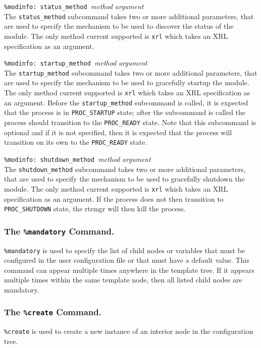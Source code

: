 \documentclass[11pt]{article}
\begin{document}
\begin{description}
\item {{\tt \%modinfo: status\_method }{\it method }{\it argument}}  \\
The {\tt status\_method} subcommand takes two or more additional parameters,
that are used to specify the mechanism to be used to discover the status of
the module.
The only method current supported is {\tt xrl} which takes an XRL
specification as an argument.

\item {{\tt \%modinfo: startup\_method }{\it method }{\it argument}}  \\
The {\tt startup\_method} subcommand takes two or more additional parameters,
that are used to specify the mechanism to be used to gracefully startup the
module. The only method current supported is {\tt xrl} which takes an XRL
specification as an argument.
Before the {\tt startup\_method} subcommand is called, it is expected
that the process is in {\tt PROC\_STARTUP} state; after the subcommand
is called the process should transition to the {\tt PROC\_READY} state.
Note that this subcommand is optional and if it is not specified, then
it is expected that the process will transition on its own to the
{\tt PROC\_READY} state.

\item {{\tt \%modinfo: shutdown\_method }{\it method }{\it argument}}  \\
The {\tt shutdown\_method} subcommand takes two or more additional parameters,
that are used to specify the mechanism to be used to gracefully shutdown the
module. The only method current supported is {\tt xrl} which takes an XRL
specification as an argument.
If the process does not then transition to {\tt PROC\_SHUTDOWN} state, the
rtrmgr will then kill the process.

\end{description}

\subsubsection{The {\tt \%mandatory} Command.}
{\tt \%mandatory} is used to specify the list of child nodes or variables
that must be configured in the user configuration file or that must
have a default value. This command can appear multiple times anywhere in the
template tree. If it appears multiple times within the same template node,
then all listed child nodes are mandatory.

\subsubsection{The {\tt \%create} Command.}
{\tt \%create} is used to create a new instance of an interior node in
the configuration tree.
\end{document}
